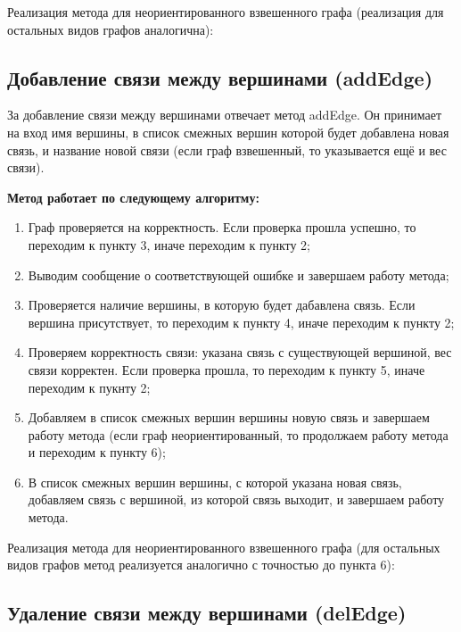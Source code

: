 \documentclass[bachelor, och, pract]{SCWorks}
\begin{document}
Реализация метода для неориентированного взвешенного графа (реализация для остальных
видов графов аналогична):
\bigskip


\bigskip

\subsection{Добавление связи между вершинами (addEdge)}

За добавление связи между вершинами отвечает метод
addEdge. Он принимает на вход имя вершины, в список смежных вершин
которой будет добавлена новая связь, и название новой связи (если
граф взвешенный, то указывается ещё и вес связи).
\bigskip

\textbf{Метод работает по следующему алгоритму:}

\begin{enumerate}
  \item {Граф проверяется на корректность. Если проверка прошла успешно,
  то переходим к пункту 3, иначе переходим к пункту 2;}
  \item {Выводим сообщение о соответствующей ошибке и завершаем работу метода;}
  \item {Проверяется наличие вершины, в которую будет дабавлена связь. Если вершина
  присутствует, то переходим к пункту 4, иначе переходим к пункту 2;}
  \item {Проверяем корректность связи: указана связь с существующей вершиной,
  вес связи корректен. Если проверка прошла, то переходим к пункту 5, иначе
  переходим к пукнту 2;}
  \item {Добавляем в список смежных вершин вершины новую связь и завершаем работу метода (если
  граф неориентированный, то продолжаем работу метода и переходим к пункту 6);}
  \item {В список смежных вершин вершины, с которой указана новая связь, добавляем
  связь с вершиной, из которой связь выходит, и завершаем работу метода.}
\end{enumerate}

Реализация метода для неориентированного взвешенного графа (для остальных видов графов
метод реализуется аналогично с точностью до пункта 6):
\bigskip


\bigskip

\subsection{Удаление связи между вершинами (delEdge)}
\end{document}
